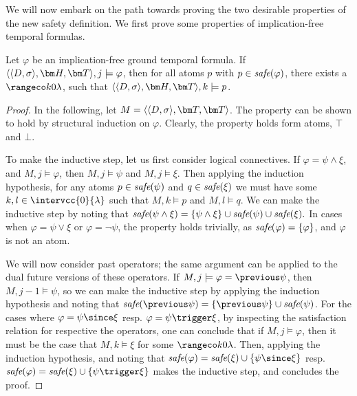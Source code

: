 We will now embark on the path towards proving the two desirable
properties of the new safety definition. We first prove some
properties of implication-free temporal formulas.

\begin{lemma}\label{lemma:safe-atomic-subformula-satisfied}
  Let $\varphi$ be an implication-free ground temporal formula. If
  $\qthandt,j \models \varphi$, then for all atoms $p$ with
  $p \in \textit{safe}(\varphi)$, there exists a $\kinlambda$, such that
  $\qthandt,k \models p$.
\end{lemma}
\begin{proof}
  In the following, let $M=\qttandt$. The property can be shown to
  hold by structural induction on $\varphi$. Clearly, the property
  holds form atoms, $\top$ and $\bot$.

  To make the inductive step, let us first consider logical
  connectives. If $\varphi = \psi \wedge \xi$, and
  $M,j \models \varphi$, then $M,j \models \psi$ and
  $M,j \models \xi$. Then applying the induction hypothesis, for any
  atoms $p \in \textit{safe}(\psi)$ and $q \in \textit{safe}(\xi)$ we must have some
  $k,l \in \intervcc{0}{\lambda}$ such that $M,k \models p$ and
  $M,l \models q$. We can make the inductive step by noting that
  $\textit{safe}(\psi \wedge \xi) = \{ \psi \wedge \xi \} \cup \textit{safe}(\psi)
  \cup \textit{safe}(\xi).$ In cases when $\varphi = \psi \vee \xi$ or
  $\varphi = \neg \psi$, the property holds trivially, as
  $\textit{safe}(\varphi) = \{ \varphi \}$, and $\varphi$ is not an atom.

  We will now consider past operators; the same argument can be
  applied to the dual future versions of these operators. If
  $M,j \models \varphi = \previous \psi$, then $M,j-1 \models \psi$,
  so we can make the inductive step by applying the induction
  hypothesis and noting that
  $\safe{\previous \psi} = \{ \previous \psi \} \cup \safe{\psi}$. For
  the cases where $\varphi = \psi \since \xi$ resp.
  $\varphi = \psi \trigger \xi$, by inspecting the satisfaction relation for
  respective the operators, one can conclude that if
  $M,j \models \varphi$, then it must be the case that
  $M,k \models \xi$ for some $\kinlambda$. Then, applying the
  induction hypothesis, and noting that
  $\safe{\varphi} = \safe{\xi} \cup \{ \psi \since \xi \}$
  resp. $\safe{\varphi} = \safe{\xi} \cup \{ \psi \trigger \xi \}$
  makes the inductive step, and concludes the proof.
  
\end{proof}

